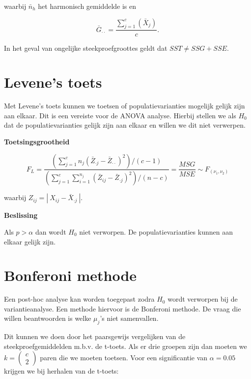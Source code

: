 \documentclass[11pt]{article}
\begin{document}
waarbij \(\bar{n}_h\) het harmonisch gemiddelde is en

\[ \bar{G}_{\cdot \cdot} = \dfrac{\sum\limits_{j=1}^c\left( \bar{X}_j \right)}{c}.\]

In het geval van ongelijke steekproefgroottes geldt dat
\(SST \not = SSG + SSE\).

    \hypertarget{levenes-toets}{%
\section{Levene's toets}\label{levenes-toets}}

    Met Levene's toets kunnen we toetsen of populatievarianties mogelijk
gelijk zijn aan elkaar. Dit is een vereiste voor de ANOVA analyse.
Hierbij stellen we als \(H_0\) dat de populatievarianties gelijk zijn
aan elkaar en willen we dit niet verwerpen.

\textbf{Toetsingsgrootheid}

\[ F_L = \dfrac{\left( \sum\limits_{j=1}^c n_j \left( \bar{Z}_{\cdot j} - \bar{Z}_{\cdot \cdot}\right)^2\right) / (c-1)}{\left( \sum\limits_{j=1}^c \sum\limits_{i=1}^{n_j} \left( \bar{Z}_{ij} - \bar{Z}_{\cdot j} \right)^2\right) / (n-c)} = \dfrac{MSG}{MSE} \sim F_{(\nu_1, \nu_2)} \]

waarbij \(Z_{ij} = \left|\ X_{ij} - \bar{X}_{\cdot j}\ \right|\).

\textbf{Beslissing}

Als \(p > \alpha\) dan wordt \(H_0\) niet verworpen. De
populatievarianties kunnen aan elkaar gelijk zijn.

    \hypertarget{bonferoni-methode}{%
\section{Bonferoni methode}\label{bonferoni-methode}}

    Een post-hoc analyse kan worden toegepast zodra \(H_0\) wordt verworpen
bij de variantieanalyse. Een methode hiervoor is de Bonferoni methode.
De vraag die willen beantwoorden is welke \(\mu_j\)'s niet samenvallen.

Dit kunnen we doen door het paarsgewijs vergelijken van de
steekproefgemiddelden m.b.v. de t-toets. Als er drie groepen zijn dan
moeten we \(k=\begin{pmatrix}c\\2\end{pmatrix}\) paren die we moeten
toetsen. Voor een significantie van \(\alpha=0.05\) krijgen we bij
herhalen van de t-toets:
\end{document}

